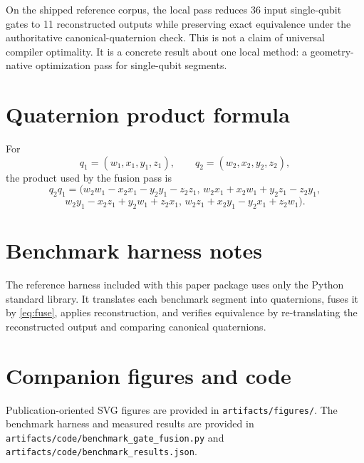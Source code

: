 \documentclass[11pt]{article}
\theoremstyle{remark}
\begin{document}
On the shipped reference corpus, the local pass reduces 36 input single-qubit
gates to 11 reconstructed outputs while preserving exact equivalence under the
authoritative canonical-quaternion check. This is not a claim of universal
compiler optimality. It is a concrete result about one local method: a
geometry-native optimization pass for single-qubit segments.

\appendix

\section{Quaternion product formula}

For
\[
q_1=(w_1,x_1,y_1,z_1),\qquad q_2=(w_2,x_2,y_2,z_2),
\]
the product used by the fusion pass is
\[
q_2 q_1=
\bigl(
w_2 w_1 - x_2 x_1 - y_2 y_1 - z_2 z_1,\,
w_2 x_1 + x_2 w_1 + y_2 z_1 - z_2 y_1,
\]
\[
w_2 y_1 - x_2 z_1 + y_2 w_1 + z_2 x_1,\,
w_2 z_1 + x_2 y_1 - y_2 x_1 + z_2 w_1
\bigr).
\]

\section{Benchmark harness notes}

The reference harness included with this paper package uses only the Python
standard library. It translates each benchmark segment into quaternions, fuses
it by \eqref{eq:fuse}, applies reconstruction, and verifies equivalence by
re-translating the reconstructed output and comparing canonical quaternions.

\section{Companion figures and code}

Publication-oriented SVG figures are provided in
\texttt{artifacts/figures/}. The benchmark harness and measured results are
provided in \texttt{artifacts/code/benchmark\_gate\_fusion.py} and
\texttt{artifacts/code/benchmark\_results.json}.


\end{document}
